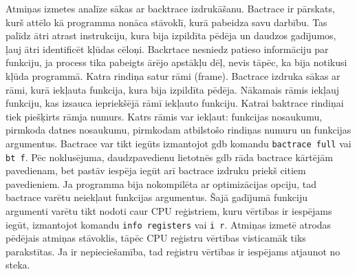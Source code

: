 Atmiņas izmetes analīze sākas ar backtrace izdrukāšanu. 
Bactrace ir pārskats, kurš attēlo kā programma nonāca stāvoklī, kurā pabeidza savu darbību.
Tas palīdz ātri atrast instrukciju, kura bija izpildīta pēdēja un daudzos gadījumos, ļauj ātri identificēt kļūdas cēloņi.
Backrtace nesniedz patieso informāciju par funkciju, ja process tika pabeigts ārējo apstākļu dēļ, nevis tāpēc, ka bija notikusi kļūda programmā.
Katra rindiņa satur rāmi (frame). Bactrace izdruka sākas ar rāmi, kurā iekļauta funkcija, kura bija izpildīta pēdēja. 
Nākamais rāmis iekļauj funkciju, kas izsauca iepriekšējā rāmī iekļauto funkciju.
Katrai baktrace rindiņai tiek piešķirts rāmja numurs. Katrs rāmis var iekļaut: funkcijas nosaukumu, pirmkoda datnes nosaukumu, pirmkodam atbilstošo rindiņas numuru un funkcijas argumentus. 
Bactrace var tikt iegūts izmantojot gdb komandu \texttt{bactrace full} vai \texttt{bt f}. 
Pēc noklusējuma, daudzpavedienu lietotnēs gdb  rāda bactrace kārtējām pavedienam, bet pastāv iespēja iegūt arī bactrace izdruku priekš citiem pavedieniem.
Ja programma bija nokompilēta ar optimizācijas opciju, tad bactrace varētu neiekļaut funkcijas argumentus.
Šajā gadījumā funkciju argumenti varētu tikt nodoti caur CPU reģistriem, kuru vērtības ir iespējams iegūt, izmantojot komandu \texttt{info registers} vai \texttt{i r}.
Atmiņas izmetē atrodas pēdējais atmiņas stāvoklis, tāpēc CPU reģistru vērtības visticamāk tiks parakstītas.
 Ja ir nepieciešamība, tad reģistru vērtības ir iespējams atjaunot no steka.



